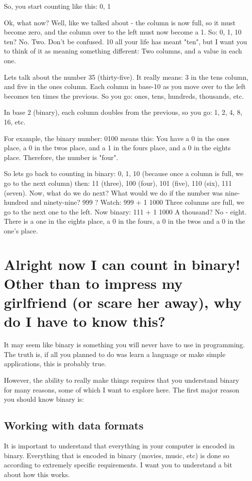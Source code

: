 \documentclass[a4paper,12pt]{article}
\let\stdsection\section
\renewcommand\section{\newpage\stdsection}
\begin{document}
So, you start counting like this: 0, 1

Ok, what now? Well, like we talked about - the column is now full, so it must become zero, and the column over to the left must now become a 1. So:
0, 1, 10
ten? No. Two. Don't be confused. 10 all your life has meant "ten", but I want you to think of it as meaning something different: Two columns, and a value in each one.

Lets talk about the number 35 (thirty-five). It really means: 3 in the tens column, and five in the ones column. Each column in base-10 as you move over to the left becomes ten times the previous. So you go: ones, tens, hundreds, thousands, etc.

In base 2 (binary), each column doubles from the previous, so you go: 1, 2, 4, 8, 16, etc.

For example, the binary number: 0100 means this: You have a 0 in the ones place, a 0 in the twos place, and a 1 in the fours place, and a 0 in the eights place. Therefore, the number is "four".

So lets go back to counting in binary:
0, 1, 10 (because once a column is full, we go to the next column) then: 11 (three), 100 (four), 101 (five), 110 (six), 111 (seven).
Now, what do we do next? What would we do if the number was nine-hundred and ninety-nine? 999 ? Watch:
999 + 1
1000
Three columns are full, we go to the next one to the left. Now binary:
111 + 1
1000
A thousand? No - eight. There is a one in the eights place, a 0 in the fours, a 0 in the twos and a 0 in the one's place.
\section{Alright now I can count in binary! Other than to impress my girlfriend (or scare her away), why do I have to know this?}
It may seem like binary is something you will never have to use in programming. The truth is, if all you planned to do was learn a language or make simple applications, this is probably true.

However, the ability to really make things requires that you understand binary for many reasons, some of which I want to explore here. The first major reason you should know binary is:
\subsection{Working with data formats}
It is important to understand that everything in your computer is encoded in binary. Everything that is encoded in binary (movies, music, etc) is done so according to extremely specific requirements. I want you to understand a bit about how this works.
\end{document}
